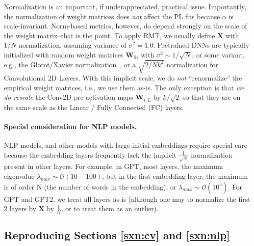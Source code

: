 Normalization is an important, if underappreciated, practical issue.
Importantly, the normalization of weight matrices does \emph{not} affect the PL fits because $\alpha$ is scale-invariant.
Norm-based metrics, however, do depend strongly on the scale of the weight matrix--that is the point.
To apply RMT, we usually define $\mathbf{X}$ with $1/N$ normalization, assuming variance of $\sigma^{2}=1.0$.
Pretrained DNNs are typically initialized with random weight matrices $\mathbf{W}_{0}$, with
 $\sigma^{2}\sim 1/\sqrt{N}$, or some variant, e.g., the Glorot/Xavier normalization~\cite{GloBen10}, or a $\sqrt{2/Nk^2}$ normalization for Convolutional 2D Layers. With this implicit scale, 
we do \emph{not} ``renormalize'' the empirical weight matrices, i.e., we use them as-is.
The only exception is that \emph{we do rescale} the Conv2D pre-activation maps $\mathbf{W}_{i,L}$ 
by $k/\sqrt{2}$ so that they are on the same scale as the Linear / Fully Connected (FC) layers.


\paragraph{Special consideration for NLP models.}

NLP models, and other models with large initial embeddings require special care because the
embedding layers frequently lack the implicit $\frac{1}{\sqrt{N}}$ normalization present in other layers.
For example, in GPT, most layers, the maximum eigenvalue $\lambda_{max}\sim\mathcal{O}(10-100)$,
but in the first embedding layer, the maximum is of order N (the number of words in the embedding), or
 $\lambda_{max}\sim\mathcal{O}(10^{5})$.  For GPT and GPT2, we treat all layers as-is (although one may to normalize
the first 2 layers by  $\mathbf{X}$ by $\frac{1}{N}$, or to treat them as an outlier).


\subsection{Reproducing Sections \ref{sxn:cv} and \ref{sxn:nlp} }   %

